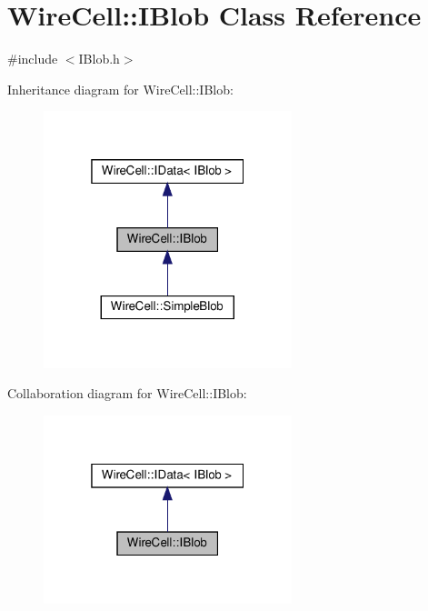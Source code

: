 \hypertarget{class_wire_cell_1_1_i_blob}{}\section{Wire\+Cell\+:\+:I\+Blob Class Reference}
\label{class_wire_cell_1_1_i_blob}


{\ttfamily \#include $<$I\+Blob.\+h$>$}



Inheritance diagram for Wire\+Cell\+:\+:I\+Blob\+:
\nopagebreak
\begin{figure}[H]
\begin{center}
\leavevmode
\includegraphics[width=205pt]{class_wire_cell_1_1_i_blob__inherit__graph}
\end{center}
\end{figure}


Collaboration diagram for Wire\+Cell\+:\+:I\+Blob\+:
\nopagebreak
\begin{figure}[H]
\begin{center}
\leavevmode
\includegraphics[width=205pt]{class_wire_cell_1_1_i_blob__coll__graph}
\end{center}
\end{figure}
